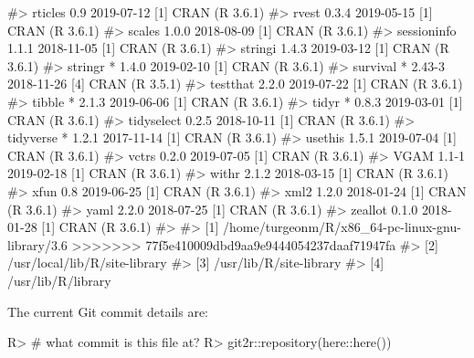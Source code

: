 \documentclass[
]{jss}
\begin{document}
\begin{CodeChunk}
\begin{CodeOutput}
#>  rticles       0.9        2019-07-12 [1] CRAN (R 3.6.1)
#>  rvest         0.3.4      2019-05-15 [1] CRAN (R 3.6.1)
#>  scales        1.0.0      2018-08-09 [1] CRAN (R 3.6.1)
#>  sessioninfo   1.1.1      2018-11-05 [1] CRAN (R 3.6.1)
#>  stringi       1.4.3      2019-03-12 [1] CRAN (R 3.6.1)
#>  stringr     * 1.4.0      2019-02-10 [1] CRAN (R 3.6.1)
#>  survival    * 2.43-3     2018-11-26 [4] CRAN (R 3.5.1)
#>  testthat      2.2.0      2019-07-22 [1] CRAN (R 3.6.1)
#>  tibble      * 2.1.3      2019-06-06 [1] CRAN (R 3.6.1)
#>  tidyr       * 0.8.3      2019-03-01 [1] CRAN (R 3.6.1)
#>  tidyselect    0.2.5      2018-10-11 [1] CRAN (R 3.6.1)
#>  tidyverse   * 1.2.1      2017-11-14 [1] CRAN (R 3.6.1)
#>  usethis       1.5.1      2019-07-04 [1] CRAN (R 3.6.1)
#>  vctrs         0.2.0      2019-07-05 [1] CRAN (R 3.6.1)
#>  VGAM          1.1-1      2019-02-18 [1] CRAN (R 3.6.1)
#>  withr         2.1.2      2018-03-15 [1] CRAN (R 3.6.1)
#>  xfun          0.8        2019-06-25 [1] CRAN (R 3.6.1)
#>  xml2          1.2.0      2018-01-24 [1] CRAN (R 3.6.1)
#>  yaml          2.2.0      2018-07-25 [1] CRAN (R 3.6.1)
#>  zeallot       0.1.0      2018-01-28 [1] CRAN (R 3.6.1)
#> 
#> [1] /home/turgeonm/R/x86_64-pc-linux-gnu-library/3.6
>>>>>>> 77f5e410009dbd9aa9e9444054237daaf71947fa
#> [2] /usr/local/lib/R/site-library
#> [3] /usr/lib/R/site-library
#> [4] /usr/lib/R/library
\end{CodeOutput}
\end{CodeChunk}

The current Git commit details are:

\begin{CodeChunk}

\begin{CodeInput}
R> # what commit is this file at? 
R> git2r::repository(here::here())
\end{CodeInput}

\end{CodeChunk}


\end{document}
